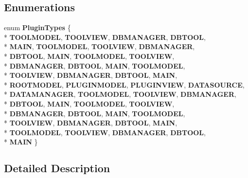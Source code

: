\subsection*{Enumerations}
\begin{DoxyCompactItemize}
\item 
enum {\bfseries Plugin\+Types} \{ \\*
{\bfseries T\+O\+O\+L\+M\+O\+D\+EL}, 
{\bfseries T\+O\+O\+L\+V\+I\+EW}, 
{\bfseries D\+B\+M\+A\+N\+A\+G\+ER}, 
{\bfseries D\+B\+T\+O\+OL}, 
\\*
{\bfseries M\+A\+IN}, 
{\bfseries T\+O\+O\+L\+M\+O\+D\+EL}, 
{\bfseries T\+O\+O\+L\+V\+I\+EW}, 
{\bfseries D\+B\+M\+A\+N\+A\+G\+ER}, 
\\*
{\bfseries D\+B\+T\+O\+OL}, 
{\bfseries M\+A\+IN}, 
{\bfseries T\+O\+O\+L\+M\+O\+D\+EL}, 
{\bfseries T\+O\+O\+L\+V\+I\+EW}, 
\\*
{\bfseries D\+B\+M\+A\+N\+A\+G\+ER}, 
{\bfseries D\+B\+T\+O\+OL}, 
{\bfseries M\+A\+IN}, 
{\bfseries T\+O\+O\+L\+M\+O\+D\+EL}, 
\\*
{\bfseries T\+O\+O\+L\+V\+I\+EW}, 
{\bfseries D\+B\+M\+A\+N\+A\+G\+ER}, 
{\bfseries D\+B\+T\+O\+OL}, 
{\bfseries M\+A\+IN}, 
\\*
{\bfseries R\+O\+O\+T\+M\+O\+D\+EL}, 
{\bfseries P\+L\+U\+G\+I\+N\+M\+O\+D\+EL}, 
{\bfseries P\+L\+U\+G\+I\+N\+V\+I\+EW}, 
{\bfseries D\+A\+T\+A\+S\+O\+U\+R\+CE}, 
\\*
{\bfseries D\+A\+T\+A\+M\+A\+N\+A\+G\+ER}, 
{\bfseries T\+O\+O\+L\+M\+O\+D\+EL}, 
{\bfseries T\+O\+O\+L\+V\+I\+EW}, 
{\bfseries D\+B\+M\+A\+N\+A\+G\+ER}, 
\\*
{\bfseries D\+B\+T\+O\+OL}, 
{\bfseries M\+A\+IN}, 
{\bfseries T\+O\+O\+L\+M\+O\+D\+EL}, 
{\bfseries T\+O\+O\+L\+V\+I\+EW}, 
\\*
{\bfseries D\+B\+M\+A\+N\+A\+G\+ER}, 
{\bfseries D\+B\+T\+O\+OL}, 
{\bfseries M\+A\+IN}, 
{\bfseries T\+O\+O\+L\+M\+O\+D\+EL}, 
\\*
{\bfseries T\+O\+O\+L\+V\+I\+EW}, 
{\bfseries D\+B\+M\+A\+N\+A\+G\+ER}, 
{\bfseries D\+B\+T\+O\+OL}, 
{\bfseries M\+A\+IN}, 
\\*
{\bfseries T\+O\+O\+L\+M\+O\+D\+EL}, 
{\bfseries T\+O\+O\+L\+V\+I\+EW}, 
{\bfseries D\+B\+M\+A\+N\+A\+G\+ER}, 
{\bfseries D\+B\+T\+O\+OL}, 
\\*
{\bfseries M\+A\+IN}
 \}\hypertarget{group__key__interfaces_ga9b3bee49ce70df90694056c2f48c2e77}{}\label{group__key__interfaces_ga9b3bee49ce70df90694056c2f48c2e77}

\end{DoxyCompactItemize}


\subsection{Detailed Description}
